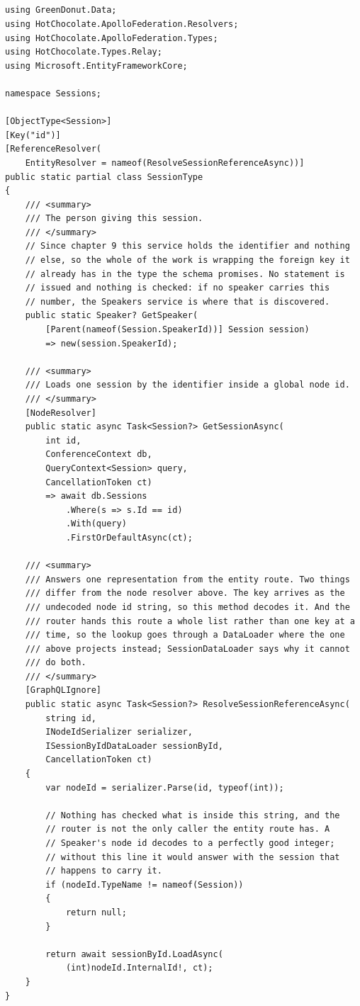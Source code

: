 \subsection*{}
\begin{verbatim}
using GreenDonut.Data;
using HotChocolate.ApolloFederation.Resolvers;
using HotChocolate.ApolloFederation.Types;
using HotChocolate.Types.Relay;
using Microsoft.EntityFrameworkCore;

namespace Sessions;

[ObjectType<Session>]
[Key("id")]
[ReferenceResolver(
    EntityResolver = nameof(ResolveSessionReferenceAsync))]
public static partial class SessionType
{
    /// <summary>
    /// The person giving this session.
    /// </summary>
    // Since chapter 9 this service holds the identifier and nothing
    // else, so the whole of the work is wrapping the foreign key it
    // already has in the type the schema promises. No statement is
    // issued and nothing is checked: if no speaker carries this
    // number, the Speakers service is where that is discovered.
    public static Speaker? GetSpeaker(
        [Parent(nameof(Session.SpeakerId))] Session session)
        => new(session.SpeakerId);

    /// <summary>
    /// Loads one session by the identifier inside a global node id.
    /// </summary>
    [NodeResolver]
    public static async Task<Session?> GetSessionAsync(
        int id,
        ConferenceContext db,
        QueryContext<Session> query,
        CancellationToken ct)
        => await db.Sessions
            .Where(s => s.Id == id)
            .With(query)
            .FirstOrDefaultAsync(ct);

    /// <summary>
    /// Answers one representation from the entity route. Two things
    /// differ from the node resolver above. The key arrives as the
    /// undecoded node id string, so this method decodes it. And the
    /// router hands this route a whole list rather than one key at a
    /// time, so the lookup goes through a DataLoader where the one
    /// above projects instead; SessionDataLoader says why it cannot
    /// do both.
    /// </summary>
    [GraphQLIgnore]
    public static async Task<Session?> ResolveSessionReferenceAsync(
        string id,
        INodeIdSerializer serializer,
        ISessionByIdDataLoader sessionById,
        CancellationToken ct)
    {
        var nodeId = serializer.Parse(id, typeof(int));

        // Nothing has checked what is inside this string, and the
        // router is not the only caller the entity route has. A
        // Speaker's node id decodes to a perfectly good integer;
        // without this line it would answer with the session that
        // happens to carry it.
        if (nodeId.TypeName != nameof(Session))
        {
            return null;
        }

        return await sessionById.LoadAsync(
            (int)nodeId.InternalId!, ct);
    }
}
\end{verbatim}

